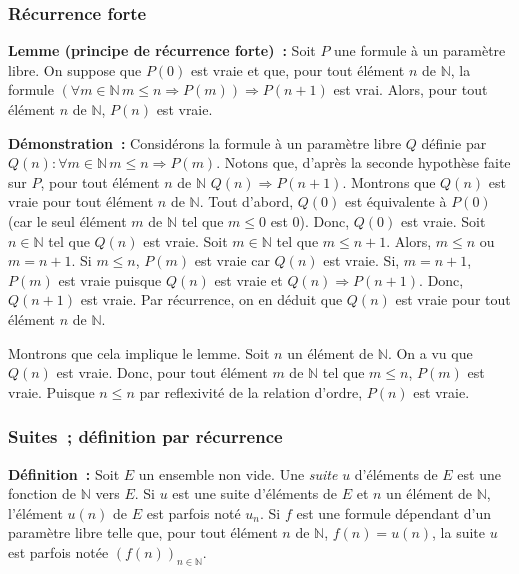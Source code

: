 \done

\subsubsection{Récurrence forte}

\noindent\textbf{Lemme (principe de récurrence forte) :} Soit $P$ une formule à un paramètre libre. 
    On suppose que $P(0)$ est vraie et que, pour tout élément $n$ de $\mathbb{N}$, la formule $(\forall m \in \mathbb{N} \, m \leq n \Rightarrow P(m)) \Rightarrow P(n+1)$ est vrai. 
    Alors, pour tout élément $n$ de $\mathbb{N}$, $P(n)$ est vraie. 

\medskip

\noindent\textbf{Démonstration :} Considérons la formule à un paramètre libre $Q$ définie par $Q(n): \forall m \in \mathbb{N} \, m \leq n \Rightarrow P(m)$. 
    Notons que, d'après la seconde hypothèse faite sur $P$, pour tout élément $n$ de $\mathbb{N}$ $Q(n) \Rightarrow P(n+1)$.
    Montrons que $Q(n)$ est vraie pour tout élément $n$ de $\mathbb{N}$. 
    Tout d'abord, $Q(0)$ est équivalente à $P(0)$ (car le seul élément $m$ de $\mathbb{N}$ tel que $m \leq 0$ est $0$). 
    Donc, $Q(0)$ est vraie. 
    Soit $n \in \mathbb{N}$ tel que $Q(n)$ est vraie. 
    Soit $m \in \mathbb{N}$ tel que $m \leq n+1$. 
    Alors, $m \leq n$ ou $m = n+1$. 
    Si $m \leq n$, $P(m)$ est vraie car $Q(n)$ est vraie.
    Si, $m = n+1$, $P(m)$ est vraie puisque $Q(n)$ est vraie et $Q(n) \Rightarrow P(n+1)$. 
    Donc, $Q(n+1)$ est vraie.
    Par récurrence, on en déduit que $Q(n)$ est vraie pour tout élément $n$ de $\mathbb{N}$.

    Montrons que cela implique le lemme. 
    Soit $n$ un élément de $\mathbb{N}$. 
    On a vu que $Q(n)$ est vraie. 
    Donc, pour tout élément $m$ de $\mathbb{N}$ tel que $m \leq n$, $P(m)$ est vraie. 
    Puisque $n \leq n$ par reflexivité de la relation d'ordre, $P(n)$ est vraie.

   \done 

\subsubsection{Suites ; définition par récurrence}
\label{subsub:suites}

\noindent\textbf{Définition :} Soit $E$ un ensemble non vide. 
    Une \textit{suite} $u$ d'éléments de $E$ est une fonction de $\mathbb{N}$ vers $E$. 
    Si $u$ est une suite d'éléments de $E$ et $n$ un élément de $\mathbb{N}$, l'élément $u(n)$ de $E$ est parfois noté $u_n$. 
    Si $f$ est une formule dépendant d'un paramètre libre telle que, pour tout élément $n$ de $\mathbb{N}$, $f(n) = u(n)$, la suite $u$ est parfois notée $\left( f(n) \right)_{n \in \mathbb{N}}$.

